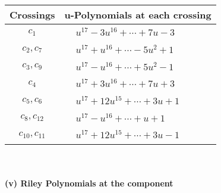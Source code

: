 \documentclass[1p]{elsarticle_modified}
\theoremstyle{definition}
\begin{document}
\begin{tabular}{m{50pt}|m{274pt}}
Crossings & \hspace{64pt}u-Polynomials at each crossing \\
\hline $$\begin{aligned}c_{1}\end{aligned}$$&$\begin{aligned}
&u^{17}-3 u^{16}+\cdots+7 u-3
\end{aligned}$\\
\hline $$\begin{aligned}c_{2},c_{7}\end{aligned}$$&$\begin{aligned}
&u^{17}+u^{16}+\cdots-5 u^2+1
\end{aligned}$\\
\hline $$\begin{aligned}c_{3},c_{9}\end{aligned}$$&$\begin{aligned}
&u^{17}- u^{16}+\cdots+5 u^2-1
\end{aligned}$\\
\hline $$\begin{aligned}c_{4}\end{aligned}$$&$\begin{aligned}
&u^{17}+3 u^{16}+\cdots+7 u+3
\end{aligned}$\\
\hline $$\begin{aligned}c_{5},c_{6}\end{aligned}$$&$\begin{aligned}
&u^{17}+12 u^{15}+\cdots+3 u+1
\end{aligned}$\\
\hline $$\begin{aligned}c_{8},c_{12}\end{aligned}$$&$\begin{aligned}
&u^{17}- u^{16}+\cdots+u+1
\end{aligned}$\\
\hline $$\begin{aligned}c_{10},c_{11}\end{aligned}$$&$\begin{aligned}
&u^{17}+12 u^{15}+\cdots+3 u-1
\end{aligned}$\\
\hline
\end{tabular}\\~\\
\newpage\renewcommand{\arraystretch}{1}
\flushleft \textbf{(v) Riley Polynomials at the component}\newline \\
\end{document}
